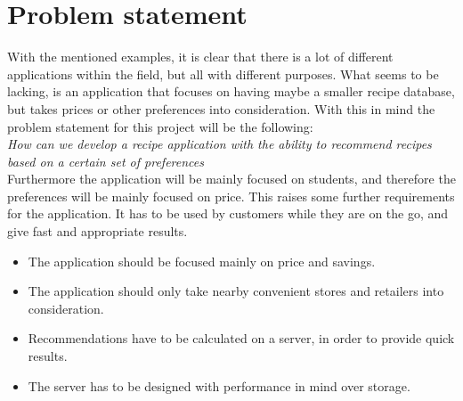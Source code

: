 \section{Problem statement}
\label{sec:probstate}

With the mentioned examples, it is clear that there is a lot of different applications within the field, but all with different purposes. What seems to be lacking, is an application that focuses on having maybe a smaller recipe database, but takes prices or other preferences into consideration. With this in mind the problem statement for this project will be the following: \\


\emph{How can we develop a recipe application with the ability to recommend recipes based on a certain set of preferences} \\


Furthermore the application will be mainly focused on students, and therefore the preferences will be mainly focused on price. This raises some further requirements for the application. It has to be used by customers while they are on the go, and give fast and appropriate results.

\begin{itemize}
\item The application should be focused mainly on price and savings.
\item The application should only take nearby convenient stores and retailers into consideration.
\item Recommendations have to be calculated on a server, in order to provide quick results.
\item The server has to be designed with performance in mind over storage.
\end{itemize}



